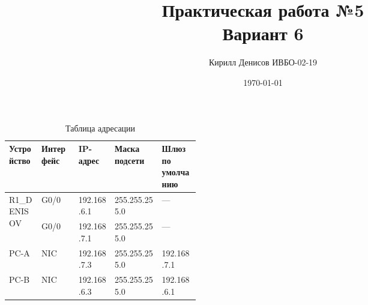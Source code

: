\documentclass[a4paper,14pt]{extarticle}
\author{Кирилл Денисов ИВБО-02-19}
\title{Практическая работа №5\\Вариант 6}
\date{\today}
\newcommand{\pathToCommonFolder}{/home/denilai/Documents/repos/latex/Common}
\begin{document}
	\newpage
	\newpage
\maketitle


\begin{table}[htbp]
\begin{center}
		\caption{Таблица адресации}
	\begin{tabular}{|p{0.17\linewidth}|l|l|l|p{0.2\linewidth}|}
		\hline
		Устройство  & Интерфейс & IP-адрес & Маска подсети & Шлюз по умолчанию \\ \hline
		\multirow{2}{*}{R1\_DENISOV} & G0/0 & 192.168.6.1 & 255.255.255.0 & --- \\ \cline{2-5}
		                            & G0/0 & 192.168.7.1 & 255.255.255.0 & --- \\ \hline
		PC-A & NIC & 192.168.7.3 & 255.255.255.0 & 192.168.7.1 \\ \hline
		PC-B & NIC & 192.168.6.3 & 255.255.255.0 & 192.168.6.1 \\ \hline
	\end{tabular}
	\label{tab:adress}
\end{center}
\end{table}
\end{document}
